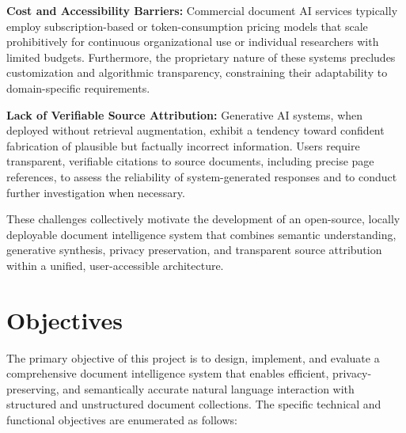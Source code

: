 \textbf{Cost and Accessibility Barriers:} Commercial document AI services typically employ subscription-based or token-consumption pricing models that scale prohibitively for continuous organizational use or individual researchers with limited budgets. Furthermore, the proprietary nature of these systems precludes customization and algorithmic transparency, constraining their adaptability to domain-specific requirements.

\textbf{Lack of Verifiable Source Attribution:} Generative AI systems, when deployed without retrieval augmentation, exhibit a tendency toward confident fabrication of plausible but factually incorrect information. Users require transparent, verifiable citations to source documents, including precise page references, to assess the reliability of system-generated responses and to conduct further investigation when necessary.

These challenges collectively motivate the development of an open-source, locally deployable document intelligence system that combines semantic understanding, generative synthesis, privacy preservation, and transparent source attribution within a unified, user-accessible architecture.

\section{Objectives}

The primary objective of this project is to design, implement, and evaluate a comprehensive document intelligence system that enables efficient, privacy-preserving, and semantically accurate natural language interaction with structured and unstructured document collections. The specific technical and functional objectives are enumerated as follows:

